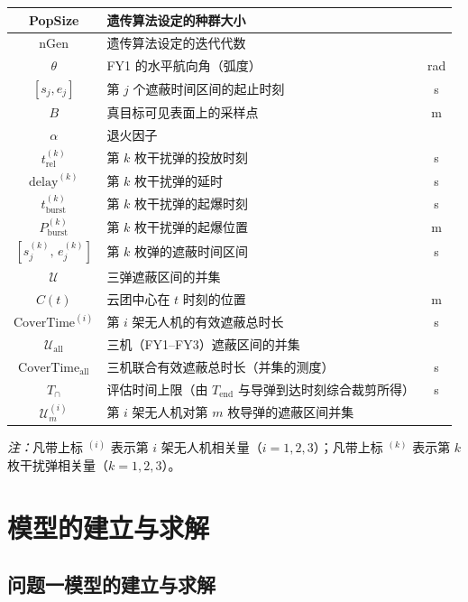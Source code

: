 \documentclass[withoutpreface,bwprint]{cumcmthesis} %
\begin{document}
\begin{longtable}{c p{} c}
	\hline
	PopSize & 遗传算法设定的种群大小 & \\
	\hline
	nGen & 遗传算法设定的迭代代数 & \\
	\hline
	$\theta$ & FY1 的水平航向角（弧度） & rad \\
	\hline
	$[s_j, e_j]$ & 第 $j$ 个遮蔽时间区间的起止时刻 & s \\
	\hline
	$B$ & 真目标可见表面上的采样点 & m \\
	\hline
	$\alpha$ & 退火因子  &  \\
	\hline
	$t_{\text{rel}}^{(k)}$ & 第 $k$ 枚干扰弹的投放时刻 & s \\
	\hline
	$\text{delay}^{(k)}$ & 第 $k$ 枚干扰弹的延时 & s \\
	\hline
	$t_{\text{burst}}^{(k)}$ & 第 $k$ 枚干扰弹的起爆时刻 & s \\
	\hline
	$P_{\text{burst}}^{(k)}$ & 第 $k$ 枚干扰弹的起爆位置 & m \\
	\hline
	$[s_j^{(k)},\,e_j^{(k)}]$ & 第 $k$ 枚弹的遮蔽时间区间 & s \\
	\hline
	$\mathcal{U}$ & 三弹遮蔽区间的并集 & \\
	\hline
	$C(t)$ & 云团中心在 $t$ 时刻的位置 & m \\
	\hline
	$\text{CoverTime}^{(i)}$ & 第 $i$ 架无人机的有效遮蔽总时长 & s \\
	\hline
	$\mathcal{U}_{\text{all}}$ & 三机（FY1–FY3）遮蔽区间的并集 & \\
	\hline
	$\text{CoverTime}_{\text{all}}$ & 三机联合有效遮蔽总时长（并集的测度） & s \\
	\hline
	$T_{\cap}$ & 评估时间上限（由 $T_{\text{end}}$ 与导弹到达时刻综合裁剪所得） & s \\
	\hline
	$\mathcal{U}^{(i)}_{m}$ & 第 $i$ 架无人机对第 $m$ 枚导弹的遮蔽区间并集 &  \\
	\hline
	
	
\end{longtable}
\noindent\textit{注：}凡带上标 \(^{(i)}\) 表示第 \(i\) 架无人机相关量（\(i=1,2,3\)）；凡带上标 \(^{(k)}\) 表示第 \(k\) 枚干扰弹相关量（\(k=1,2,3\)）。


\section{模型的建立与求解}

\subsection{问题一模型的建立与求解}
\end{document}
